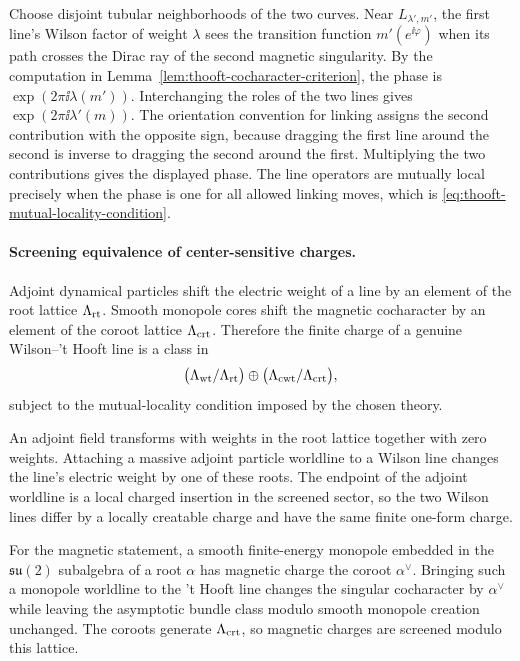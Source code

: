 Choose disjoint tubular neighborhoods of the two curves.  Near
\(L_{\lambda',m'}\), the first line's Wilson factor of weight \(\lambda\)
sees the transition function \(m'(e^{\ii\varphi})\) when its path crosses the
Dirac ray of the second magnetic singularity.  By the computation in
Lemma~\ref{lem:thooft-cocharacter-criterion}, the phase is
\(\exp(2\pi\ii\lambda(m'))\).  Interchanging the roles of the two lines gives
\(\exp(2\pi\ii\lambda'(m))\).  The orientation convention for linking assigns
the second contribution with the opposite sign, because dragging the first
line around the second is inverse to dragging the second around the first.
Multiplying the two contributions gives the displayed phase.  The line
operators are mutually local precisely when the phase is one for all allowed
linking moves, which is \eqref{eq:thooft-mutual-locality-condition}.

\paragraph{Screening equivalence of center-sensitive charges.}
Adjoint dynamical particles shift the electric weight of a line by an element
of the root lattice \(\Lambda_{\rm rt}\).  Smooth monopole cores shift the
magnetic cocharacter by an element of the coroot lattice
\(\Lambda_{\rm crt}\).  Therefore the finite charge of a genuine
Wilson--'t Hooft line is a class in
\[
  \bigl(\Lambda_{\rm wt}/\Lambda_{\rm rt}\bigr)
  \oplus
  \bigl(\Lambda_{\rm cwt}/\Lambda_{\rm crt}\bigr),
\]
subject to the mutual-locality condition imposed by the chosen theory.

An adjoint field transforms with weights in the root lattice together with
zero weights.  Attaching a massive adjoint particle worldline to a Wilson
line changes the line's electric weight by one of these roots.  The endpoint
of the adjoint worldline is a local charged insertion in the screened sector,
so the two Wilson lines differ by a locally creatable charge and have the
same finite one-form charge.

For the magnetic statement, a smooth finite-energy monopole embedded in the
\(\mathfrak{su}(2)\) subalgebra of a root \(\alpha\) has magnetic charge the
coroot \(\alpha^\vee\).  Bringing such a monopole worldline to the
't Hooft line changes the singular cocharacter by \(\alpha^\vee\) while
leaving the asymptotic bundle class modulo smooth monopole creation
unchanged.  The coroots generate \(\Lambda_{\rm crt}\), so magnetic charges
are screened modulo this lattice.

